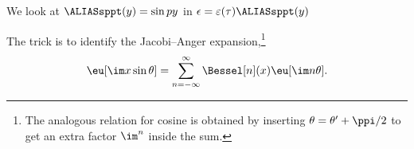 



\newcommand{\sppt}{\ALIASsppt}



We look at $\sppt(y)=\sin{py}$ in $\epsilon= \varepsilon(\tau) \sppt(y)$

The trick is to identify the Jacobi--Anger expansion,\footnote{
    The analogous relation for cosine is obtained by inserting $\theta = \theta' + \ppi/2$ to get an extra factor $\im^n$ inside the sum.
}
\begin{equation}
    \eu[\im x \sin{\theta}] = \sum_{n=-\infty}^{\infty} \Bessel[n](x) \eu[\im n \theta].
\end{equation}
